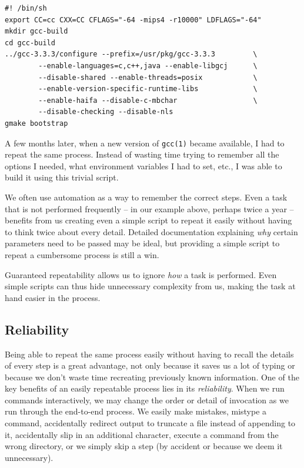 \begin{lstlisting}[float,label=code:automation:gcc,caption={[Script
to build GCC on an old IRIX system]Building a 64-bit
version of the GNU Compiler Collection on an old IRIX
system. Even if done rarely, storing these commands in
a rudimentary script can help repeat the process more
easily. (With plenty of room for improvement, Problem
\ref{prob:automation:improve-script} will ask you to
turn this into a more reliable, more readable tool.)}]
#! /bin/sh
export CC=cc CXX=CC CFLAGS="-64 -mips4 -r10000" LDFLAGS="-64"
mkdir gcc-build
cd gcc-build
../gcc-3.3.3/configure --prefix=/usr/pkg/gcc-3.3.3         \
        --enable-languages=c,c++,java --enable-libgcj      \
        --disable-shared --enable-threads=posix            \
        --enable-version-specific-runtime-libs             \
        --enable-haifa --disable-c-mbchar                  \
        --disable-checking --disable-nls
gmake bootstrap
\end{lstlisting}

A few months later, when a new version of
\verb+gcc(1)+ became available, I had to repeat the
same process.  Instead of wasting time trying to
remember all the options I needed, what environment
variables I had to set, etc., I was able to build it
using this trivial script.

We often use automation as a way to remember the
correct steps.  Even a task that is not performed
frequently -- in our example above, perhaps twice a
year -- benefits from us creating even a simple script
to repeat it easily without having to think twice
about every detail.  Detailed documentation explaining
{\em why} certain parameters need to be passed may be
ideal, but providing a simple script to repeat a
cumbersome process is still a win.

Guaranteed repeatability allows us to ignore {\em how}
a task is performed.  Even simple scripts can thus
hide unnecessary complexity from us, making the task
at hand easier in the process.

\subsection{Reliability}
\label{automation:benefits:reliability}

Being able to repeat the same process easily without
having to recall the details of every step is a great
advantage, not only because it saves us a lot of
typing or because we don't waste time recreating
previously known information.  One of the key benefits
of an easily repeatable process lies in its {\em
reliability}.  When we run commands interactively, we
may change the order or detail of invocation as we run
through the end-to-end process.  We easily make
mistakes, mistype a command, accidentally redirect
output to truncate a file instead of appending to it,
accidentally slip in an additional character, execute
a command from the wrong directory, or we simply skip
a step (by accident or because we deem it
unnecessary).


